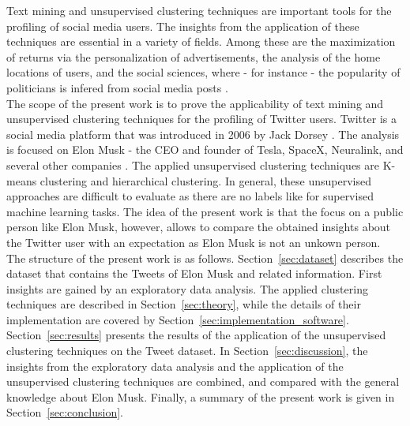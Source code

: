 Text mining and unsupervised clustering techniques are important tools for the profiling of social media users. The insights from the application of these techniques are essential in a variety of fields. Among these are the maximization of returns via the personalization of advertisements, the analysis of the home locations of users, and the social sciences, where - for instance - the popularity of politicians is infered from social media posts \cite{advertisement_2016}\cite{home_2012}\cite{socialscience_2018}. \\

The scope of the present work is to prove the applicability of text mining and unsupervised clustering techniques for the profiling of Twitter users. Twitter is a social media platform that was introduced in 2006 by Jack Dorsey \cite{twitter}. The analysis is focused on Elon Musk - the CEO and founder of Tesla, SpaceX, Neuralink, and several other companies \cite{musk_2015}. The applied unsupervised clustering techniques are K-means clustering and hierarchical clustering. In general, these unsupervised approaches are difficult to evaluate as there are no labels like for supervised machine learning tasks. The idea of the present work is that the focus on a public person like Elon Musk, however, allows to compare the obtained insights about the Twitter user with an expectation as Elon Musk is not an unkown person. \\

The structure of the present work is as follows. Section~\ref{sec:dataset} describes the dataset that contains the Tweets of Elon Musk and related information. First insights are gained by an exploratory data analysis. The applied clustering techniques are described in Section~\ref{sec:theory}, while the details of their implementation are covered by Section~\ref{sec:implementation_software}. Section~\ref{sec:results} presents the results of the application of the unsupervised clustering techniques on the Tweet dataset. In Section~\ref{sec:discussion}, the insights from the exploratory data analysis and the application of the unsupervised clustering techniques are combined, and compared with the general knowledge about Elon Musk. Finally, a summary of the present work is given in Section~\ref{sec:conclusion}.